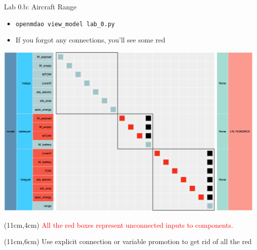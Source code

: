 \documentclass[aspectratio=169, usenames,dvipsnames, 14pt]{beamer}
\begin{document}

\begin{frame}{Lab 0.b: Aircraft Range}
    \begin{itemize}
        \item \texttt{openmdao view\_model lab\_0.py}
        \item If you forgot any connections, you’ll see some red
    \end{itemize}
    
    \includegraphics[scale=0.21]{images/lab_0_N2.png}
    
    \begin{textblock*}{4cm}(11cm,4cm)
        \small \textcolor{red}{All the red boxes represent unconnected inputs to components.}
    \end{textblock*}
    
    \begin{textblock*}{4cm}(11cm,6cm)
        \small Use explicit connection or variable promotion to get rid of all the red
    \end{textblock*}
\end{frame}

\end{document}
